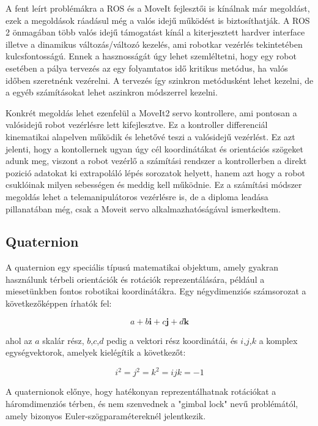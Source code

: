 A fent leírt problémákra a ROS és a MoveIt fejlesztői is kínálnak már megoldást, ezek a megoldások ráadásul még a valós idejű működést is biztosíthatják. A ROS 2 önmagában több valós idejű támogatást kínál a kiterjesztett hardver interface illetve a dinamikus változás/változó kezelés, ami robotkar vezérlés tekintetében kulcsfontosságú. Ennek a hasznosságát úgy lehet szemléltetni, hogy egy robot esetében a pálya tervezés az egy folyamtatos idő kritikus metódus, ha valós időben szeretnénk vezérelni. A tervezés így szinkron metódusként lehet kezelni, de a egyéb számításokat lehet aszinkron módszerrel kezelni.

Konkrét megoldás lehet ezenfelül a MoveIt2 servo kontrollere, ami pontosan a valósidejű robot vezérlésre lett kifejlesztve. Ez a kontroller differenciál kinematikai alapelven működik és lehetővé teszi a valósidejű vezérlést. Ez azt jelenti, hogy a kontollernek ugyan úgy cél koordinátákat és orientációs szögeket adunk meg, viszont a robot vezérlő a számítási rendszer a kontrollerben a direkt pozició adatokat ki extrapoláló lépés sorozatok helyett, hanem azt hogy a robot csuklóinak milyen sebességen és meddig kell működnie. Ez a számítási módszer megoldás lehet a telemanipulátoros vezérlésre is, de a diploma leadása pillanatában még, csak a Moveit servo alkalmazhatóságával ismerkedtem.

\subsection{Quaternion}
A quaternion egy speciális típusú matematikai objektum, amely gyakran használunk térbeli orientációk és rotációk reprezentálására, például a miesetünkben fontos robotikai koordinátákra. Egy négydimenziós számsorozat a következőképpen írhatók fel:

\begin{equation}
a + b \textbf{i} + c \textbf{j} + d \textbf{k} 
\end{equation}

ahol az $a$ skalár rész, $b$,$c$,$d$ pedig a vektori rész koordinátái, és $i$,$j$,$k$ a komplex egységvektorok, amelyek kielégítik a következőt: 

\begin{equation}
i^2=j^2=k^2=ijk=-1
\end{equation}

A quaternionok előnye, hogy hatékonyan reprezentálhatnak rotációkat a háromdimenziós térben, és nem szenvednek a "gimbal lock" nevű problémától, amely bizonyos Euler-szögparamétereknél jelentkezik.

